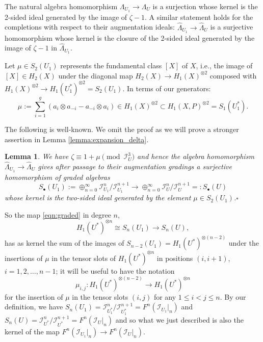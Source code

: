 \documentclass[12pt,letterpaper]{amsart}
\numberwithin{equation}{section}
\def\Ical{{\mathcal I}}
\def\pt{{\scriptscriptstyle\bullet}}
\newtheorem{lemma}[theorem]{Lemma}
\theoremstyle{remark}
\begin{document}
The natural algebra homomorphism $\Lambda_{U_1}\to \Lambda_U$ is a surjection whose kernel is the 2-sided ideal generated by the image of  $\zeta-1$. A similar statement holds
for the  completions with respect to their augmentation ideals:  $\hat \Lambda_{U_1}\to \hat \Lambda_{U}$ is a surjective homomorphism  
whose kernel is the closure of the  2-sided ideal generated by the image of  $\zeta-1$ in $\hat \Lambda_{U_1}$.  

Let $\mu\in S_2(U_1)$ represents the  fundamental class $[X]$ of $X$, i.e.,  the image of $[X]\in H_2(X)$ under the diagonal map  $H_2(X)\to H_1(X)^{\otimes 2}$ composed with   $H_1(X)^{\otimes 2}\to H_1(U^*_1)^{\otimes 2}=S_2(U_1)$. In terms of our generators:
\begin{equation}\label{eqn:muX}
\textstyle \mu:=\sum_{i=1}^g(a_i\otimes a_{-i}-a_{-i}\otimes a_i)\in H_1(X)^{\otimes 2}\subset H_1(X,P)^{\otimes 2}=S_1(U_1^*).
\end{equation}

The following is well-known. We omit the proof as we will prove a stronger assertion in Lemma \ref{lemma:expansion_delta}.

\begin{lemma}\label{lemma:gradepass}
We have  $\zeta\equiv 1+\mu \pmod{\Ical^3_U}$ and hence the algebra homomorphism $\hat \Lambda_{U_1}\to \hat \Lambda_{U}$ gives after passage to their augmentation gradings
a surjective homomorphism of graded algebras
\begin{equation}\label{eqn:graded}
S_\pt (U_1):=\oplus_{n=0}^\infty \Ical_{U_1}^{n}/\Ical_{U_1}^{n+1}\to  \oplus_{n=0}^\infty \Ical_{U}^{n}/\Ical_{U}^{n+1}=: S_\pt (U)
\end{equation}
whose  kernel is the two-sided ideal generated by the element $\mu\in S_2(U_1)$.\hfill $\square$
\end{lemma}

So  the map \eqref{eqn:graded} in degree $n$, 
\[
H_1(U^*)^{\otimes n}\cong S_n(U_1)\to S_n(U),
\]
has as kernel the sum of the images of $S_{n-2}(U_1)=H_1(U^*)^{\otimes (n-2)}$ under the insertions of $\mu$ in the tensor slots of $H_1(U^*)^{\otimes n}$  in positions $(i, i+1)$, $i=1,2,\dots, n-1$; it will be useful to have the notation  
\begin{equation}\label{eqn:mu-tensor}
    \mu_{i,j}:H_1(U^*)^{\otimes(n-2)}\to H_1(U^*)^{\otimes n}
\end{equation}
for the insertion of $\mu$ in the tensor slots $(i,j)$ for any $1\le i<j\le n$.
By our definition, we  have $S_n(U_1)=\Ical_{U_1^*}^{n}/\Ical_{U_1^*}^{n+1}=
F^n(\Ical_{U_1}|_n)$ and  $S_n(U)=\Ical_{U^*}^{n}/\Ical_{U^*}^{n+1}=F^n(\Ical_{U}|_n)$ and so what we just described
is also the kernel of the map $F^n(\Ical_{U_1}|_n)\to F^n(\Ical_{U}|_n)$.  
\end{document}
